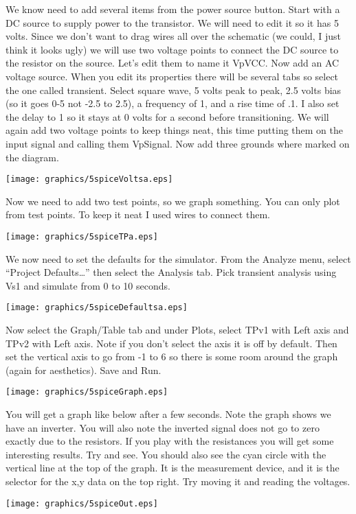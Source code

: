 \raggedbottom\pagebreak
We know need to add several items from the power source button.  Start with a DC source to supply power to the transistor.  We will need to edit it so it has 5 volts.  Since we don't want to drag wires all over the schematic (we could, I just think it looks ugly) we will use two voltage points to connect the DC source to the resistor on the source.  Let's edit them to name it VpVCC.  Now add an AC voltage source.  When you edit its properties there will be several tabs so select the one called transient.  Select square wave, 5 volts peak to peak, 2.5 volts bias (so it goes 0-5 not -2.5 to 2.5), a frequency of 1, and a rise time of .1.  I also set the delay to 1 so it stays at 0 volts for a second before transitioning.  We will again add two voltage points to keep things neat, this time putting them on the input signal and calling them VpSignal.  Now add three grounds where marked on the diagram.

\texttt{[image: graphics/5spiceVoltsa.eps]}

\raggedbottom\pagebreak
Now we need to add two test points, so we graph something.  You can only plot from test points.  To keep it neat I used wires to connect them.

\texttt{[image: graphics/5spiceTPa.eps]}

\raggedbottom\pagebreak
We now need to set the defaults for the simulator.  From the Analyze menu, select ``Project Defaults\dots'' then select the Analysis tab.  Pick transient analysis using Vs1 and simulate from 0 to 10 seconds.

\texttt{[image: graphics/5spiceDefaultsa.eps]}

\raggedbottom\pagebreak
Now select the Graph/Table tab and under Plots, select TPv1 with Left axis and TPv2 with Left axis.  Note if you don't select the axis it is off by default.  Then set the vertical axis to go from -1 to 6 so there is some room around the graph (again for aesthetics).  Save and Run.

\texttt{[image: graphics/5spiceGraph.eps]}

\raggedbottom\pagebreak
You will get a graph like below after a few seconds.  Note the graph shows we have an inverter.  You will also note the inverted signal does not go to zero exactly due to the resistors.  If you play with the resistances you will get some interesting results.  Try and see.  You should also see the cyan circle with the vertical line at the top of the graph.  It is the measurement device, and it is the selector for the x,y data on the top right.  Try moving it and reading the voltages.

\texttt{[image: graphics/5spiceOut.eps]}
